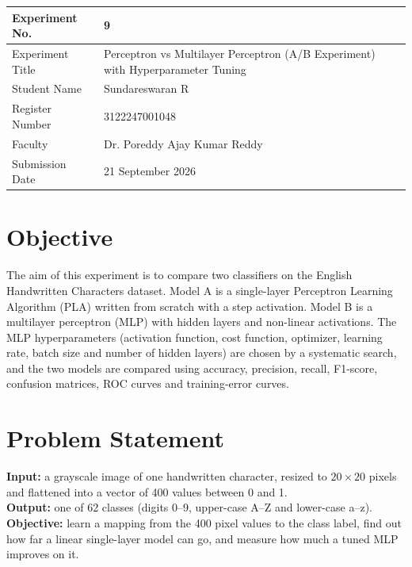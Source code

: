 \documentclass[12pt,a4paper]{article}
\begin{document}
\begin{tabular}{|p{4cm}|p{11cm}|}
\hline
Experiment No. & 9 \\ \hline
Experiment Title & Perceptron vs Multilayer Perceptron (A/B Experiment) with Hyperparameter Tuning\footnotemark \\ \hline
Student Name & Sundareswaran R \\ \hline
Register Number & 3122247001048 \\ \hline
Faculty & Dr. Poreddy Ajay Kumar Reddy \\ \hline
Submission Date & 21 September 2026 \\ \hline
\end{tabular}

\section{Objective}
The aim of this experiment is to compare two classifiers on the English Handwritten Characters dataset. Model A is a single-layer Perceptron Learning Algorithm (PLA) written from scratch with a step activation. Model B is a multilayer perceptron (MLP) with hidden layers and non-linear activations. The MLP hyperparameters (activation function, cost function, optimizer, learning rate, batch size and number of hidden layers) are chosen by a systematic search, and the two models are compared using accuracy, precision, recall, F1-score, confusion matrices, ROC curves and training-error curves.

\section{Problem Statement}
\textbf{Input:} a grayscale image of one handwritten character, resized to $20\times20$ pixels and flattened into a vector of 400 values between 0 and 1.\\
\textbf{Output:} one of 62 classes (digits 0--9, upper-case A--Z and lower-case a--z).\\
\textbf{Objective:} learn a mapping from the 400 pixel values to the class label, find out how far a linear single-layer model can go, and measure how much a tuned MLP improves on it.

\end{document}
